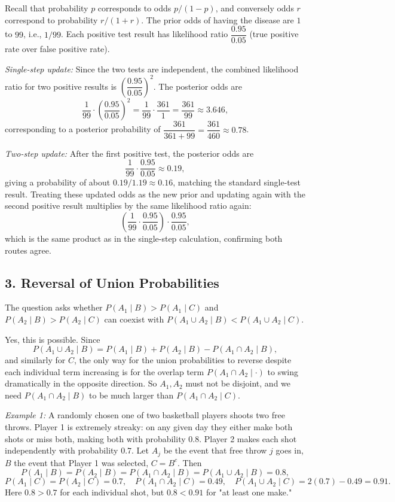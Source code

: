 \documentclass{article}
\begin{document}
Recall that probability $p$ corresponds to odds $p/(1-p)$, and conversely odds $r$ correspond to probability $r/(1+r)$. The prior odds of having the disease are $1$ to $99$, i.e., $1/99$. Each positive test result has likelihood ratio $\dfrac{0.95}{0.05}$ (true positive rate over false positive rate).

\emph{Single-step update:} Since the two tests are independent, the combined likelihood ratio for two positive results is $\left(\dfrac{0.95}{0.05}\right)^2$. The posterior odds are
$$
\frac{1}{99}\cdot\left(\frac{0.95}{0.05}\right)^2 = \frac{1}{99}\cdot\frac{361}{1} = \frac{361}{99} \approx 3.646,
$$
corresponding to a posterior probability of $\dfrac{361}{361+99}=\dfrac{361}{460}\approx 0.78$.

\emph{Two-step update:} After the first positive test, the posterior odds are
$$
\frac{1}{99}\cdot\frac{0.95}{0.05}\approx 0.19,
$$
giving a probability of about $0.19/1.19\approx 0.16$, matching the standard single-test result. Treating these updated odds as the new prior and updating again with the second positive result multiplies by the same likelihood ratio again:
$$
\left(\frac{1}{99}\cdot\frac{0.95}{0.05}\right)\cdot\frac{0.95}{0.05},
$$
which is the same product as in the single-step calculation, confirming both routes agree.

\subsection*{3. Reversal of Union Probabilities}

The question asks whether $P(A_1\mid B)>P(A_1\mid C)$ and $P(A_2\mid B)>P(A_2\mid C)$ can coexist with $P(A_1\cup A_2\mid B) < P(A_1\cup A_2\mid C)$.

Yes, this is possible. Since
$$
P(A_1\cup A_2\mid B) = P(A_1\mid B)+P(A_2\mid B)-P(A_1\cap A_2\mid B),
$$
and similarly for $C$, the only way for the union probabilities to reverse despite each individual term increasing is for the overlap term $P(A_1\cap A_2\mid \cdot)$ to swing dramatically in the opposite direction. So $A_1,A_2$ must not be disjoint, and we need $P(A_1\cap A_2\mid B)$ to be much larger than $P(A_1\cap A_2\mid C)$.

\medskip
\emph{Example 1:} A randomly chosen one of two basketball players shoots two free throws. Player 1 is extremely streaky: on any given day they either make both shots or miss both, making both with probability $0.8$. Player 2 makes each shot independently with probability $0.7$. Let $A_j$ be the event that free throw $j$ goes in, $B$ the event that Player 1 was selected, $C=B^c$. Then
$$
P(A_1\mid B)=P(A_2\mid B)=P(A_1\cap A_2\mid B)=P(A_1\cup A_2\mid B)=0.8,
$$
$$
P(A_1\mid C)=P(A_2\mid C)=0.7,\quad P(A_1\cap A_2\mid C)=0.49,\quad P(A_1\cup A_2\mid C)=2(0.7)-0.49=0.91.
$$
Here $0.8>0.7$ for each individual shot, but $0.8<0.91$ for "at least one make."
\end{document}

